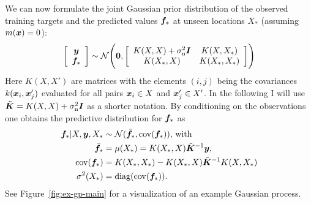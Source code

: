 We can now formulate the joint Gaussian prior distribution of the observed 
training targets and the predicted values $\bm{f}_*$ at unseen locations $X_*$ 
(assuming $m(\bm{x}) = 0$):
\begin{equation}
    \left[ \begin{array}{c}\vc y \\ \vc f_* \end{array} \right]
    \sim\mathcal{N}\!\del{\vc{0}, \sbr{\begin{array}{cc} K(X, X) 
                + \sigma\ped{n}^2 \mat I & K(X, X_*) \\ K(X_*, X) & K(X_*, X_*) 
            \end{array}}}
\end{equation}
Here $K(X, X')$ are matrices with the elements $(i, j)$ being the covariances 
$k(\bm{x}_i, \bm{x}'_j)$ evaluated for all pairs $\bm{x}_i \in X$ and $\bm{x}'_j \in 
X'$. In the following I will use $\tilde{\bm{K}} = K(X, X) + \sigma_{\mathrm{n}}^2 
\bm{I}$ as a shorter notation. By conditioning on the observations one obtains 
the predictive distribution for $\bm{f}_*$ as
\begin{align}
    \bm{f}_* | X, \bm{y}, X_* &\sim \mathcal{N}(\bar{\bm{f}_*}, \operatorname{cov}(\bm{f}_*))\text{, with}\\
    \bar{\bm{f}_*} &= \mu(X_*) = K(X_*, X)\tilde{\bm{K}}^{-1} \bm{y}\text{,} 
    \label{eqn:meanpred} \\
    \operatorname{cov}(\bm{f}_*) &= K(X_*, X_*) - K(X_*, X)\tilde{\bm{K}}^{-1}K(X, X_*) 
    \label{eqn:covpred} \\
    \sigma^2(X_*) &= \operatorname{diag}(\operatorname{cov}(\bm{f}_*)) \text{.}
\end{align}
See Figure~\ref{fig:ex-gp-main} for a visualization of an example Gaussian 
process.


